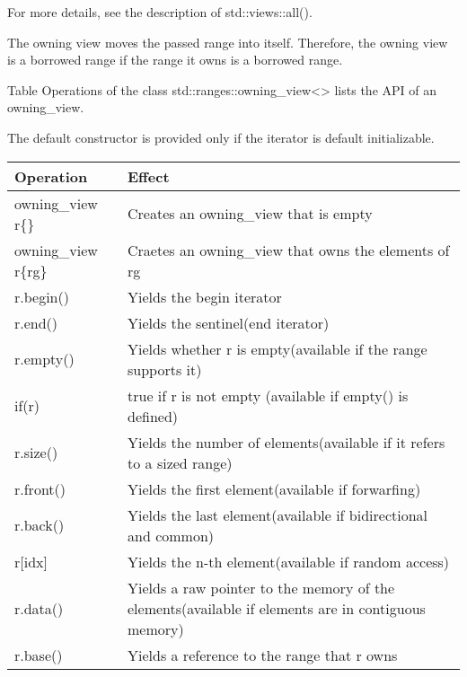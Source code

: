For more details, see the description of std::views::all().



The owning view moves the passed range into itself. Therefore, the owning view is a borrowed range if the range it owns is a borrowed range.


Table Operations of the class std::ranges::owning\_view<> lists the API of an owning\_view.

The default constructor is provided only if the iterator is default initializable.

\begin{longtable}[c]{|l|l|}
	\hline
	\textbf{Operation}   & \textbf{Effect}                                                \\ \hline
	\endfirsthead
	\endhead
	owning\_view r\{\}   & Creates an owning\_view that is empty                          \\ \hline
	owning\_view r\{rg\} & Craetes an owning\_view that owns the elements of rg           \\ \hline
	r.begin()            & Yields the begin iterator                                      \\ \hline
	r.end()              & Yields the sentinel(end iterator)                              \\ \hline
	r.empty()            & Yields whether r is empty(available if the range supports it)  \\ \hline
	if(r)                & true if r is not empty (available if empty() is defined)       \\ \hline
	r.size() & Yields the number of elements(available if it refers to a sized range)                             \\ \hline
	r.front()            & Yields the first element(available if forwarfing)              \\ \hline
	r.back()             & Yields the last element(available if bidirectional and common) \\ \hline
	r{[}idx{]}           & Yields the n-th element(available if random access)            \\ \hline
	r.data() & Yields a raw pointer to the memory of the elements(available if elements are in contiguous memory) \\ \hline
	r.base()             & Yields a reference to the range that r owns                    \\ \hline
\end{longtable}


